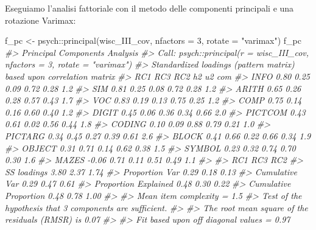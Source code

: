 \documentclass[
  11pt,
]{krantz}
\makeatletter
\newenvironment{Shaded}{\begin{snugshade}}{\end{snugshade}}
\newcommand{\AttributeTok}[1]{\textcolor[rgb]{0.61,0.61,0.61}{#1}}
\newcommand{\CommentTok}[1]{\textcolor[rgb]{0.37,0.37,0.37}{\textit{#1}}}
\newcommand{\DecValTok}[1]{\textcolor[rgb]{0.06,0.06,0.06}{#1}}
\newcommand{\FunctionTok}[1]{\textcolor[rgb]{0,0,0}{#1}}
\newcommand{\NormalTok}[1]{#1}
\newcommand{\OtherTok}[1]{\textcolor[rgb]{0.37,0.37,0.37}{#1}}
\newcommand{\SpecialCharTok}[1]{\textcolor[rgb]{0,0,0}{#1}}
\newcommand{\StringTok}[1]{\textcolor[rgb]{0.5,0.5,0.5}{#1}}
\newenvironment{kframe}{%
\medskip{}
\setlength{\fboxsep}{.8em}
 \def\at@end@of@kframe{}%
 \ifinner\ifhmode%
  \def\at@end@of@kframe{\end{minipage}}%
  \begin{minipage}{\columnwidth}%
 \fi\fi%
 \def\FrameCommand##1{\hskip\@totalleftmargin \hskip-\fboxsep
 \colorbox{shadecolor}{##1}\hskip-\fboxsep
     \hskip-\linewidth \hskip-\@totalleftmargin \hskip\columnwidth}%
 \MakeFramed {\advance\hsize-\width
   \@totalleftmargin\z@ \linewidth\hsize
   \@setminipage}}%
 {\par\unskip\endMakeFramed%
 \at@end@of@kframe}
\renewenvironment{Shaded}{\begin{kframe}}{\end{kframe}}
\theoremstyle{definition}
\theoremstyle{definition}
\theoremstyle{definition}
\theoremstyle{definition}
\theoremstyle{remark}
\makeatother
\begin{document}
Eseguiamo l'analisi fattoriale con il metodo delle componenti principali e una rotazione Varimax:

\begin{Shaded}
\begin{Highlighting}[]
\NormalTok{f\_pc }\OtherTok{\textless{}{-}}\NormalTok{ psych}\SpecialCharTok{::}\FunctionTok{principal}\NormalTok{(wisc\_III\_cov, }\AttributeTok{nfactors =} \DecValTok{3}\NormalTok{, }\AttributeTok{rotate =} \StringTok{"varimax"}\NormalTok{)}
\NormalTok{f\_pc}
\CommentTok{\#\textgreater{} Principal Components Analysis}
\CommentTok{\#\textgreater{} Call: psych::principal(r = wisc\_III\_cov, nfactors = 3, rotate = "varimax")}
\CommentTok{\#\textgreater{} Standardized loadings (pattern matrix) based upon correlation matrix}
\CommentTok{\#\textgreater{}           RC1  RC3  RC2   h2   u2 com}
\CommentTok{\#\textgreater{} INFO     0.80 0.25 0.09 0.72 0.28 1.2}
\CommentTok{\#\textgreater{} SIM      0.81 0.25 0.08 0.72 0.28 1.2}
\CommentTok{\#\textgreater{} ARITH    0.65 0.26 0.28 0.57 0.43 1.7}
\CommentTok{\#\textgreater{} VOC      0.83 0.19 0.13 0.75 0.25 1.2}
\CommentTok{\#\textgreater{} COMP     0.75 0.14 0.16 0.60 0.40 1.2}
\CommentTok{\#\textgreater{} DIGIT    0.45 0.06 0.36 0.34 0.66 2.0}
\CommentTok{\#\textgreater{} PICTCOM  0.43 0.61 0.02 0.56 0.44 1.8}
\CommentTok{\#\textgreater{} CODING   0.10 0.09 0.88 0.79 0.21 1.0}
\CommentTok{\#\textgreater{} PICTARG  0.34 0.45 0.27 0.39 0.61 2.6}
\CommentTok{\#\textgreater{} BLOCK    0.41 0.66 0.22 0.66 0.34 1.9}
\CommentTok{\#\textgreater{} OBJECT   0.31 0.71 0.14 0.62 0.38 1.5}
\CommentTok{\#\textgreater{} SYMBOL   0.23 0.32 0.74 0.70 0.30 1.6}
\CommentTok{\#\textgreater{} MAZES   {-}0.06 0.71 0.11 0.51 0.49 1.1}
\CommentTok{\#\textgreater{} }
\CommentTok{\#\textgreater{}                        RC1  RC3  RC2}
\CommentTok{\#\textgreater{} SS loadings           3.80 2.37 1.74}
\CommentTok{\#\textgreater{} Proportion Var        0.29 0.18 0.13}
\CommentTok{\#\textgreater{} Cumulative Var        0.29 0.47 0.61}
\CommentTok{\#\textgreater{} Proportion Explained  0.48 0.30 0.22}
\CommentTok{\#\textgreater{} Cumulative Proportion 0.48 0.78 1.00}
\CommentTok{\#\textgreater{} }
\CommentTok{\#\textgreater{} Mean item complexity =  1.5}
\CommentTok{\#\textgreater{} Test of the hypothesis that 3 components are sufficient.}
\CommentTok{\#\textgreater{} }
\CommentTok{\#\textgreater{} The root mean square of the residuals (RMSR) is  0.07 }
\CommentTok{\#\textgreater{} }
\CommentTok{\#\textgreater{} Fit based upon off diagonal values = 0.97}
\end{Highlighting}
\end{Shaded}
\end{document}
